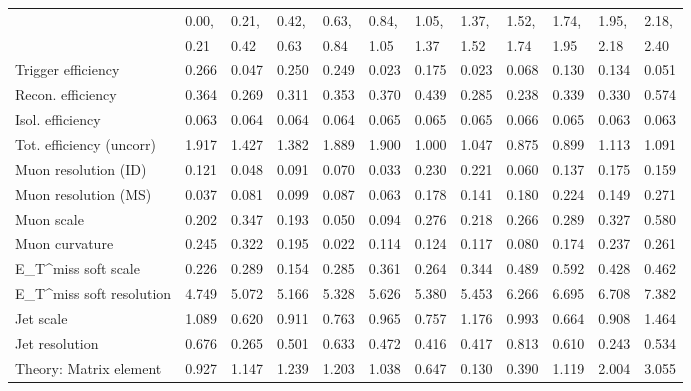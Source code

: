 \begin{tabular}{l|p{0.6cm}p{0.6cm}p{0.6cm}p{0.6cm}p{0.6cm}p{0.6cm}p{0.6cm}p{0.6cm}p{0.6cm}p{0.6cm}p{0.6cm}}
\hline
   & 0.00, & 0.21, & 0.42, & 0.63, & 0.84, & 1.05, & 1.37, & 1.52, & 1.74, & 1.95, & 2.18,  \\ 
   & 0.21 & 0.42 & 0.63 & 0.84 & 1.05 & 1.37 & 1.52 & 1.74 & 1.95 & 2.18 & 2.40  \\ 
\hline
Trigger efficiency                       & 0.266 & 0.047 & 0.250 & 0.249 & 0.023 & 0.175 & 0.023 & 0.068 & 0.130 & 0.134 & 0.051 \\
Recon. efficiency                        & 0.364 & 0.269 & 0.311 & 0.353 & 0.370 & 0.439 & 0.285 & 0.238 & 0.339 & 0.330 & 0.574 \\
Isol. efficiency                         & 0.063 & 0.064 & 0.064 & 0.064 & 0.065 & 0.065 & 0.065 & 0.066 & 0.065 & 0.063 & 0.063 \\
Tot. efficiency (uncorr)                 & 1.917 & 1.427 & 1.382 & 1.889 & 1.900 & 1.000 & 1.047 & 0.875 & 0.899 & 1.113 & 1.091 \\
Muon resolution (ID)                     & 0.121 & 0.048 & 0.091 & 0.070 & 0.033 & 0.230 & 0.221 & 0.060 & 0.137 & 0.175 & 0.159 \\
Muon resolution (MS)                     & 0.037 & 0.081 & 0.099 & 0.087 & 0.063 & 0.178 & 0.141 & 0.180 & 0.224 & 0.149 & 0.271 \\
Muon scale                               & 0.202 & 0.347 & 0.193 & 0.050 & 0.094 & 0.276 & 0.218 & 0.266 & 0.289 & 0.327 & 0.580 \\
Muon curvature                           & 0.245 & 0.322 & 0.195 & 0.022 & 0.114 & 0.124 & 0.117 & 0.080 & 0.174 & 0.237 & 0.261 \\
E_{T}^{miss} soft scale                  & 0.226 & 0.289 & 0.154 & 0.285 & 0.361 & 0.264 & 0.344 & 0.489 & 0.592 & 0.428 & 0.462 \\
E_{T}^{miss} soft resolution             & 4.749 & 5.072 & 5.166 & 5.328 & 5.626 & 5.380 & 5.453 & 6.266 & 6.695 & 6.708 & 7.382 \\
Jet scale                                & 1.089 & 0.620 & 0.911 & 0.763 & 0.965 & 0.757 & 1.176 & 0.993 & 0.664 & 0.908 & 1.464 \\
Jet resolution                           & 0.676 & 0.265 & 0.501 & 0.633 & 0.472 & 0.416 & 0.417 & 0.813 & 0.610 & 0.243 & 0.534 \\
Theory: Matrix element                   & 0.927 & 1.147 & 1.239 & 1.203 & 1.038 & 0.647 & 0.130 & 0.390 & 1.119 & 2.004 & 3.055 \\

\end{tabular}
